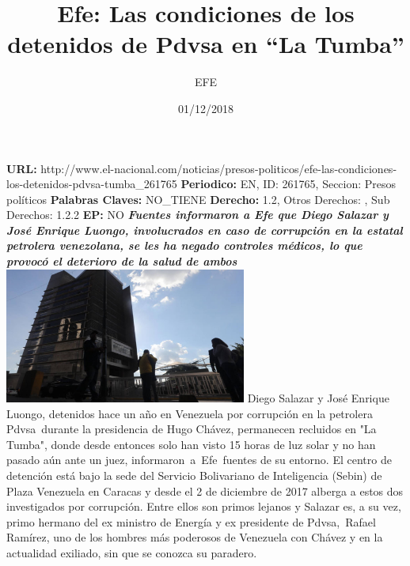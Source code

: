 \documentclass{article}%
\title{\textbf{Efe: Las condiciones de los detenidos de Pdvsa en “La Tumba”}}%
\author{EFE}%
\date{01/12/2018}%
\begin{document}
%
\normalsize%
\maketitle%
\textbf{URL: }%
http://www.el{-}nacional.com/noticias/presos{-}politicos/efe{-}las{-}condiciones{-}los{-}detenidos{-}pdvsa{-}tumba\_261765\newline%
%
\textbf{Periodico: }%
EN, %
ID: %
261765, %
Seccion: %
Presos políticos\newline%
%
\textbf{Palabras Claves: }%
NO\_TIENE\newline%
%
\textbf{Derecho: }%
1.2, %
Otros Derechos: %
, %
Sub Derechos: %
1.2.2\newline%
%
\textbf{EP: }%
NO\newline%
\newline%
%
\textbf{\textit{Fuentes informaron a Efe que Diego Salazar y José Enrique Luongo, involucrados en caso de corrupción en la estatal petrolera venezolana, se les ha negado controles médicos, lo que provocó el deterioro de la salud de ambos}}%
\newline%
\newline%
%
\includegraphics[width=300px]{9.jpg}%
\newline%
%
Diego Salazar y José Enrique Luongo, detenidos hace un año en Venezuela por corrupción en la petrolera Pdvsa~durante la presidencia de Hugo Chávez, permanecen recluidos en "La Tumba", donde desde entonces solo han visto 15 horas de luz solar y no han pasado aún ante un juez, informaron~a~Efe~fuentes de su entorno.%
\newline%
%
El centro de detención está bajo la sede del Servicio Bolivariano de Inteligencia (Sebin) de Plaza Venezuela en Caracas y desde el 2 de diciembre de 2017 alberga a estos dos investigados por corrupción.%
\newline%
%
Entre ellos son primos lejanos y Salazar es, a su vez, primo hermano del ex ministro de Energía y ex presidente de Pdvsa,~Rafael Ramírez, uno de los hombres más poderosos de Venezuela con Chávez y en la actualidad exiliado, sin que se conozca su paradero.%
\end{document}
